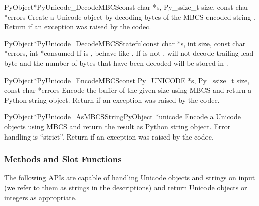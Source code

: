 \begin{cfuncdesc}{PyObject*}{PyUnicode_DecodeMBCS}{const char *s,
                                               Py_ssize_t size,
                                               const char *errors}
  Create a Unicode object by decoding  bytes of the MBCS
  encoded string .  Return \NULL{} if an exception was
  raised by the codec.
\end{cfuncdesc}

\begin{cfuncdesc}{PyObject*}{PyUnicode_DecodeMBCSStateful}{const char *s,
                                               int size,
                                               const char *errors,
                                               int *consumed}
  If  is \NULL{}, behave like
  . If  is not \NULL{},
   will not decode trailing lead
  byte and the number of bytes that have been decoded will be stored in
  .
\end{cfuncdesc}

\begin{cfuncdesc}{PyObject*}{PyUnicode_EncodeMBCS}{const Py_UNICODE *s,
                                               Py_ssize_t size,
                                               const char *errors}
  Encode the  buffer of the given size using MBCS
  and return a Python string object.  Return \NULL{} if an exception
  was raised by the codec.
\end{cfuncdesc}

\begin{cfuncdesc}{PyObject*}{PyUnicode_AsMBCSString}{PyObject *unicode}
  Encode a Unicode objects using MBCS and return the result as
  Python string object.  Error handling is ``strict''.  Return
  \NULL{} if an exception was raised by the codec.
\end{cfuncdesc}


\subsubsection{Methods and Slot Functions \label{unicodeMethodsAndSlots}}

The following APIs are capable of handling Unicode objects and strings
on input (we refer to them as strings in the descriptions) and return
Unicode objects or integers as appropriate.

